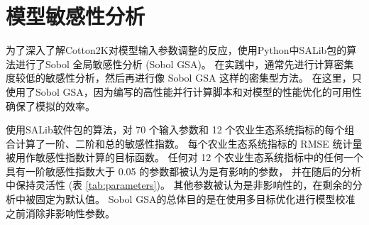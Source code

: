 \chapter{模型敏感性分析}\label{chap:sa}
为了深入了解Cotton2K对模型输入参数调整的反应，使用Python中SALib包的算法进行了Sobol 全局敏感性分析 (Sobol GSA)。%
在实践中，通常先进行计算密集度较低的敏感性分析，然后再进行像 Sobol GSA 这样的密集型方法。%
在这里，只使用了Sobol GSA，因为编写的高性能并行计算脚本和对模型的性能优化的可用性确保了模拟的效率。

使用SALib软件包的算法，对 70 个输入参数和 12 个农业生态系统指标的每个组合计算了一阶、二阶和总的敏感性指数。%
每个农业生态系统指标的 RMSE 统计量被用作敏感性指数计算的目标函数。%
任何对 12 个农业生态系统指标中的任何一个具有一阶敏感性指数大于 0.05 的参数都被认为是有影响的参数，%
并在随后的分析中保持灵活性 (表 \ref{tab:parameters})。%
其他参数被认为是非影响性的，在剩余的分析中被固定为默认值。%
Sobol GSA的总体目的是在使用多目标优化进行模型校准之前消除非影响性参数。
